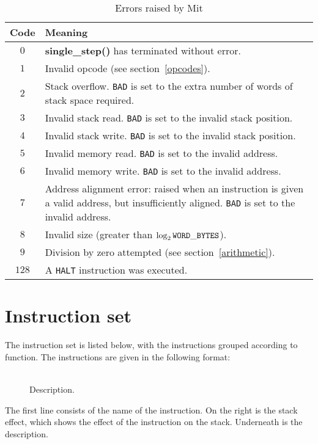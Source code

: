 \documentclass[a4paper]{article}
\newcommand{\spic}[1]{\texttt{\textsl{#1\/}}}
\newlength{\itemwidth}\itemwidth=\textwidth \advance\itemwidth by -0.1in
\newlength{\instname}\instname=1.5in
\newlength{\stackcom}\stackcom=3.0in
\newcommand{\inst}[3]{\item[]\parbox{\itemwidth}%
{\makebox[\instname][l]{\tt #1}%
\makebox[\stackcom][r]{\tt ( \spic{#2} )}\\[0.5ex]#3}}
\begin{document}
\begin{table}[htbp]
\begin{center}
\begin{tabular}{cp{4in}} \toprule
\bf Code & \bf Meaning \\ \midrule
$0$ & {\bf single\_step()} has terminated without error. \\
$1$ & Invalid opcode (see section~\ref{opcodes}). \\
$2$ & Stack overflow. {\tt BAD} is set to the extra number of words of stack space required. \\
$3$ & Invalid stack read. {\tt BAD} is set to the invalid stack position. \\
$4$ & Invalid stack write. {\tt BAD} is set to the invalid stack position. \\
$5$ & Invalid memory read. {\tt BAD} is set to the invalid address. \\
$6$ & Invalid memory write. {\tt BAD} is set to the invalid address. \\
$7$ & Address alignment error: raised when an instruction is given a valid address, but insufficiently aligned. {\tt BAD} is set to the invalid address. \\
$8$ & Invalid size (greater than $\log_2{\tt WORD\_BYTES}$). \\
$9$ & Division by zero attempted (see section~\ref{arithmetic}). \\
$128$ & A {\tt HALT} instruction was executed. \\
 \bottomrule
\end{tabular}
\caption{\label{errortable}Errors raised by Mit}
\end{center}
\end{table}


\section{Instruction set}
\label{instset}

The instruction set is listed below,
with the instructions grouped according to function. The
instructions are given in the following format:

\begin{description}
\inst{NAME}{before — after}{Description.}
\end{description}

The first line consists of the name of the instruction. On the right is the
stack effect, which shows the effect of the instruction on the stack.
Underneath is the description.
\end{document}
